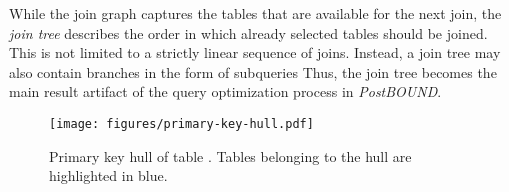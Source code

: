 
While the join graph captures the tables that are available for the next join, the \emph{join tree} describes the order in which already selected tables should be joined. 
This is not limited to a strictly linear sequence of joins. 
Instead, a join tree may also contain branches in the form of subqueries 
Thus, the join tree becomes the main result artifact of the query optimization process in \emph{PostBOUND}.

\begin{figure}[tb]
	\centering
	\texttt{[image: figures/primary-key-hull.pdf]}
	\caption{Primary key hull of table . Tables belonging to the hull are highlighted in blue.}
	\label{fig:primary-key-hull}
\end{figure}

